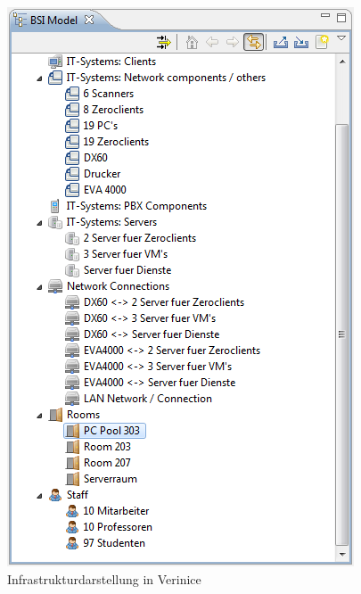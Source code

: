 \begin{figure}[htbp]
	\includegraphics[scale=0.5]{images/verinicestruktur}
	\caption{Infrastrukturdarstellung in Verinice}
	\label{fig:veriniceStruktur}
\end{figure}


